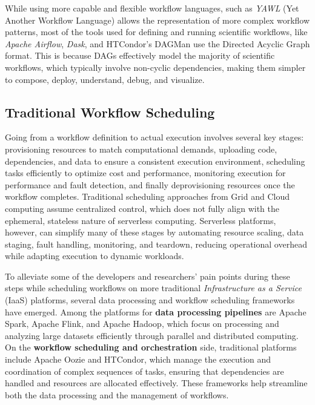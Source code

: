 While using more capable and flexible workflow languages, such as \textit{YAWL} (Yet Another Workflow Language) allows the representation of more complex workflow patterns, most of the tools used for defining and running scientific workflows, like \textit{Apache Airflow}, \textit{Dask}, and HTCondor's DAGMan use the Directed Acyclic Graph format. This is because DAGs effectively model the majority of scientific workflows, which typically involve non-cyclic dependencies, making them simpler to compose, deploy, understand, debug, and visualize.

\subsection{Traditional Workflow Scheduling}
Going from a workflow definition to actual execution involves several key stages: provisioning resources to match computational demands, uploading code, dependencies, and data to ensure a consistent execution environment, scheduling tasks efficiently to optimize cost and performance, monitoring execution for performance and fault detection, and finally deprovisioning resources once the workflow completes. Traditional scheduling approaches from Grid and Cloud computing assume centralized control, which does not fully align with the ephemeral, stateless nature of serverless computing. Serverless platforms, however, can simplify many of these stages by automating resource scaling, data staging, fault handling, monitoring, and teardown, reducing operational overhead while adapting execution to dynamic workloads.

To alleviate some of the developers and researchers' pain points during these steps while scheduling workflows on more traditional \textit{Infrastructure as a Service} (IaaS) platforms, several data processing and workflow scheduling frameworks have emerged. Among the platforms for \textbf{data processing pipelines} are Apache Spark\cite{apache_spark}, Apache Flink\cite{apache_flink}, and Apache Hadoop\cite{apache_hadoop}, which focus on processing and analyzing large datasets efficiently through parallel and distributed computing. On the \textbf{workflow scheduling and orchestration} side, traditional platforms include Apache Oozie\cite{apache_oozie} and HTCondor\cite{htcondor}, which manage the execution and coordination of complex sequences of tasks, ensuring that dependencies are handled and resources are allocated effectively. These frameworks help streamline both the data processing and the management of workflows.

